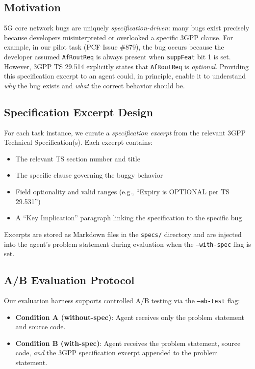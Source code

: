 \documentclass{article}
\begin{document}
\subsection{Motivation}

5G core network bugs are uniquely \emph{specification-driven}: many bugs exist precisely because developers misinterpreted or overlooked a specific 3GPP clause. For example, in our pilot task (PCF Issue \#879), the bug occurs because the developer assumed \texttt{AfRoutReq} is always present when \texttt{suppFeat} bit 1 is set. However, 3GPP TS 29.514 explicitly states that \texttt{AfRoutReq} is \emph{optional}. Providing this specification excerpt to an agent could, in principle, enable it to understand \emph{why} the bug exists and \emph{what} the correct behavior should be.

\subsection{Specification Excerpt Design}

For each task instance, we curate a \emph{specification excerpt} from the relevant 3GPP Technical Specification(s). Each excerpt contains:
\begin{itemize}
    \item The relevant TS section number and title
    \item The specific clause governing the buggy behavior
    \item Field optionality and valid ranges (e.g., ``Expiry is OPTIONAL per TS 29.531'')
    \item A ``Key Implication'' paragraph linking the specification to the specific bug
\end{itemize}

Excerpts are stored as Markdown files in the \texttt{specs/} directory and are injected into the agent's problem statement during evaluation when the \texttt{--with-spec} flag is set.

\subsection{A/B Evaluation Protocol}

Our evaluation harness supports controlled A/B testing via the \texttt{--ab-test} flag:

\begin{itemize}
    \item \textbf{Condition A (without-spec)}: Agent receives only the problem statement and source code.
    \item \textbf{Condition B (with-spec)}: Agent receives the problem statement, source code, \emph{and} the 3GPP specification excerpt appended to the problem statement.
\end{itemize}
\end{document}
